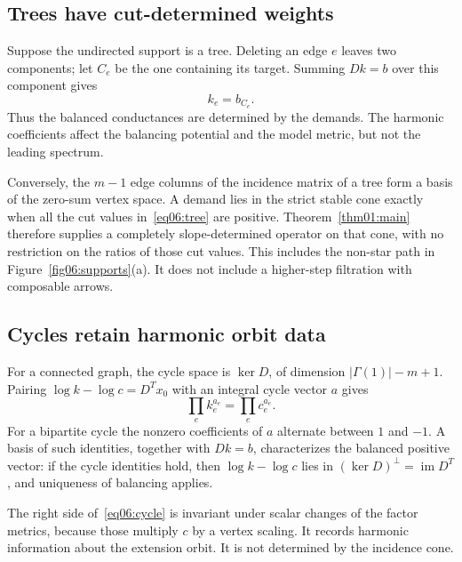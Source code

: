\documentclass[11pt]{amsart}
\theoremstyle{definition}
\theoremstyle{remark}
\begin{document}
\subsection{Trees have cut-determined weights}

Suppose the undirected support is a tree. Deleting an edge \(e\)
leaves two components; let \(C_e\) be the one containing its target.
Summing \(Dk=b\) over this component gives
\begin{equation}\label{eq06:tree}
 k_e=b_{C_e}.
\end{equation}
Thus the balanced conductances are determined by the demands.
The harmonic coefficients affect the balancing potential and the
model metric, but not the leading spectrum.

Conversely, the \(m-1\) edge columns of the incidence matrix of
a tree form a basis of the zero-sum vertex space. A demand lies
in the strict stable cone exactly when all the cut values
in~\eqref{eq06:tree} are positive. Theorem~\ref{thm01:main}
therefore supplies a completely slope-determined operator on that
cone, with no restriction on the ratios of those cut values.
This includes the non-star path in Figure~\ref{fig06:supports}(a).
It does not include a higher-step filtration with composable arrows.

\subsection{Cycles retain harmonic orbit data}

For a connected graph, the cycle space is \(\ker D\), of
dimension \(|\Gamma(1)|-m+1\). Pairing
\(\log k-\log c=D^Tx_0\) with an integral cycle vector \(a\)
gives
\begin{equation}\label{eq06:cycle}
 \prod_e k_e^{a_e}=\prod_e c_e^{a_e}.
\end{equation}
For a bipartite cycle the nonzero coefficients of \(a\) alternate
between \(1\) and \(-1\). A basis of such identities, together
with \(Dk=b\), characterizes the balanced positive vector:
if the cycle identities hold, then
\(\log k-\log c\) lies in \((\ker D)^\perp=\operatorname{im}D^T\),
and uniqueness of balancing applies.

The right side of~\eqref{eq06:cycle} is invariant under scalar
changes of the factor metrics, because those multiply \(c\)
by a vertex scaling. It records harmonic information about the
extension orbit. It is not determined by the incidence cone.
\end{document}
